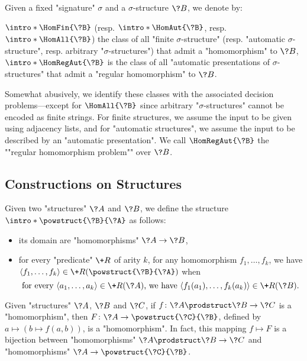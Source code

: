 Given a fixed "signature" $\sigma$ and a $\sigma$-structure $\?B$,
we denote by:
\begin{itemize}
	\itemAP $\intro*\HomFin{\?B}$ (resp. $\intro*\HomAut{\?B}$, resp.
	$\intro*\HomAll{\?B}$) the class of all "finite $\sigma$-structure"
	(resp. "automatic $\sigma$-structure", resp. arbitrary "$\sigma$-structures")
	that admit a "homomorphism" to $\?B$,
	\itemAP $\intro*\HomRegAut{\?B}$ is the class of all "automatic presentations of  $\sigma$-structures" that admit a "regular homomorphism" to $\?B$.
\end{itemize}
Somewhat abusively, we identify these classes with the associated decision problems---except
for $\HomAll{\?B}$ since arbitrary "$\sigma$-structures" cannot be encoded as finite strings.
For finite structures, we assume the input to be given using adjacency lists, and for "automatic 
structures", we assume the input to be described by an "automatic presentation".
We call $\HomRegAut{\?B}$ the \AP""regular homomorphism problem"" over $\?B$.


\subsection{Constructions on Structures}

Given two "structures" $\?A$ and $\?B$, we define the structure \AP$\intro*\powstruct{\?B}{\?A}$ as follows:
\begin{itemize}
  \item its domain are "homomorphisms" $\?A \to \?B$,
  \item for every "predicate" $\+R$ of arity $k$, for any homomorphism $f_1,\dotsc,f_k$,
  we have $\langle f_1,\dotsc,f_k\rangle \in \+R(\powstruct{\?B}{\?A})$ when 
  \[
	\text{for every }
	\langle a_1,\dotsc,a_k\rangle \in \+R(\?A)
	\text{, we have }
	\langle f_1(a_1), \dotsc, f_k(a_k) \rangle \in \+R(\?B).
  \]
\end{itemize}


\begin{proposition}
	\AP\label{prop:currying-hom}
	Given "structures" $\?A$, $\?B$ and $\?C$, if $f\colon \?A\prodstruct \?B \to \?C$
	is a "homomorphism", then $F\colon \?A \to \powstruct{\?C}{\?B}$,
	defined by $a \mapsto (b \mapsto f(a,b))$, is a "homomorphism".
	In fact, this mapping $f \mapsto F$ is a bijection
	between "homomorphisms" $\?A\prodstruct \?B \to \?C$
	and "homomorphisms" $\?A \to \powstruct{\?C}{\?B}$.
\end{proposition}

